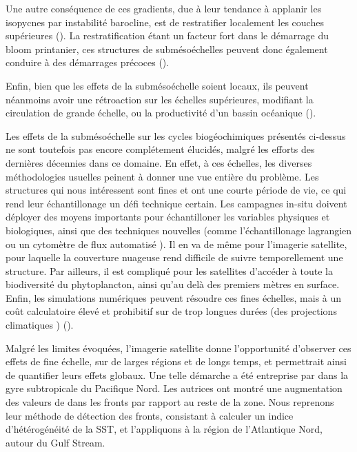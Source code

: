 Une autre conséquence de ces gradients, due à leur tendance à applanir les isopycnes par instabilité barocline, est de restratifier localement les couches supérieures (\cite{fox-kemper_2008}).
La restratification étant un facteur fort dans le démarrage du bloom printanier, ces structures de submésoéchelles peuvent donc également conduire à des démarrages précoces (\cite{mahadevan_2020}).

Enfin, bien que les effets de la submésoéchelle soient locaux, ils peuvent néanmoins avoir une rétroaction sur les échelles supérieures, modifiant la circulation de grande échelle, ou la productivité d'un bassin océanique (\cite{levy_2012a,balwada_2022}).

Les effets de la submésoéchelle sur les cycles biogéochimiques présentés ci-dessus ne sont toutefois pas encore complétement élucidés, malgré les efforts des dernières décennies dans ce domaine.
En effet, à ces échelles, les diverses méthodologies usuelles peinent à donner une vue entière du problème.
Les structures qui nous intéressent sont fines et ont une courte période de vie, ce qui rend leur échantillonage  un défi technique certain.
Les campagnes in-situ doivent déployer des moyens importants pour échantilloner les variables physiques et biologiques, ainsi que des techniques nouvelles (comme l'échantillonage lagrangien ou un cytomètre de flux automatisé \cite{thyssen_2015,marrec_2018,tzortzis_2021}).
Il en va de même pour l'imagerie satellite, pour laquelle la couverture nuageuse rend difficile de suivre temporellement une structure.
Par ailleurs, il est compliqué pour les satellites d'accéder à toute la biodiversité du phytoplancton, ainsi qu'au delà des premiers mètres en surface.
Enfin, les simulations numériques peuvent résoudre ces fines échelles, mais à un coût calculatoire élevé et prohibitif sur de trop longues durées (des projections climatiques ) (\cite{fox-kemper_2019}).

Malgré les limites évoquées, l'imagerie satellite donne l'opportunité d'observer ces effets de fine échelle, sur de larges régions et de longs temps, et permettrait ainsi de quantifier leurs effets globaux.
Une telle démarche a été entreprise par \textcite{liu_2016} dans la gyre subtropicale du Pacifique Nord.
Les autrices  ont montré une augmentation des valeurs de  dans les fronts par rapport au reste de la zone.
Nous reprenons leur méthode de détection des fronts, consistant à calculer un indice d'hétérogénéité de la SST, et l'appliquons à la région de l'Atlantique Nord, autour du Gulf Stream.

